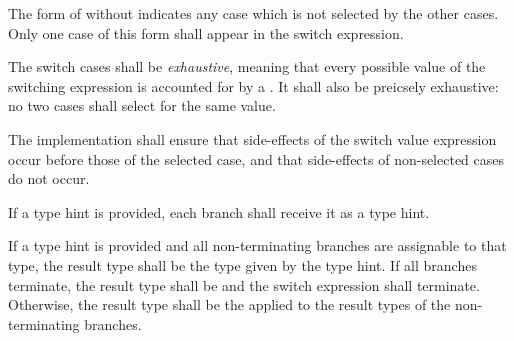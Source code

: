 
\specsubsubitem
The form of  without 
indicates any case which is not selected by the other cases. Only one case of
this form shall appear in the switch expression.

\specsubsubitem
The switch cases shall be \textit{exhaustive}, meaning that every possible
value of the switching expression is accounted for by a
. It shall also be preicsely exhaustive: no two cases
shall select for the same value.

\specsubsubitem
The implementation shall ensure that side-effects of the switch value
expression occur before those of the selected case, and that side-effects of
non-selected cases do not occur.

\specsubsubitem
If a type hint is provided, each branch shall receive it as a type hint.

\specsubsubitem
If a type hint is provided and all non-terminating branches are assignable to
that type, the result type shall be the type given by the type hint. If all
branches terminate, the result type shall be  and the switch
expression shall terminate. Otherwise, the result type shall be the
 applied to the result types of the
non-terminating branches.


\begin{grammar}
 \\
	 \terminal{(}  \terminal{)} \terminal{\{}  \terminal{\}} \\

 \\
	  \\

 \\
	   \terminal{:}  \terminal{=>}  \\
	  \terminal{(}  \terminal{)} \terminal{:}  \terminal{=>}  \\
	  \terminal{=>}  \\
	 \terminal{=>}  \\
\end{grammar}

